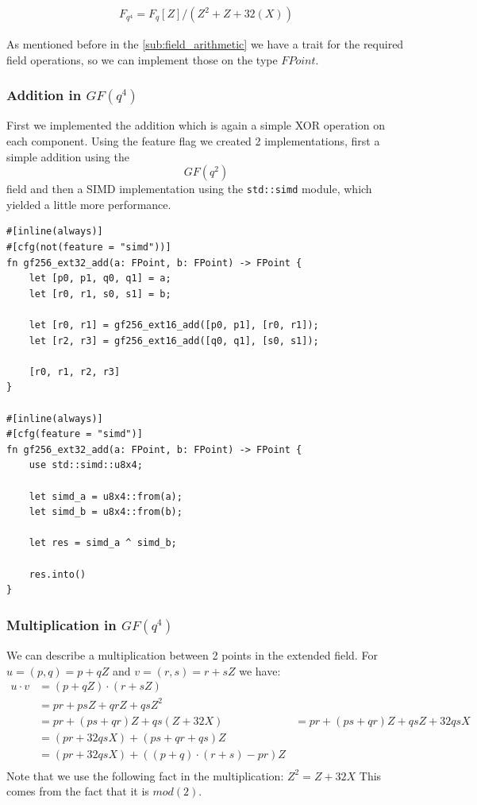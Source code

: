 \documentclass[11pt]{report}
\theoremstyle{definition}
\theoremstyle{plain}
\begin{document}
\begin{align}
  F_{q^4} = F_q[Z] / (Z^2 + Z + 32(X))
\end{align}

As mentioned before in the \autoref{sub:field_arithmetic} we have a trait for the required field operations, so we can implement those on the type $FPoint$.

\subsubsection{Addition in $GF(q^4)$}

First we implemented the addition which is again a simple XOR operation on each component. Using the feature flag we created 2 implementations, first a simple addition using the $$GF(q^2)$$ field and then a SIMD implementation using the \texttt{std::simd} module, which yielded a little more performance.
\begin{verbatim}
#[inline(always)]
#[cfg(not(feature = "simd"))]
fn gf256_ext32_add(a: FPoint, b: FPoint) -> FPoint {
    let [p0, p1, q0, q1] = a;
    let [r0, r1, s0, s1] = b;

    let [r0, r1] = gf256_ext16_add([p0, p1], [r0, r1]);
    let [r2, r3] = gf256_ext16_add([q0, q1], [s0, s1]);

    [r0, r1, r2, r3]
}

#[inline(always)]
#[cfg(feature = "simd")]
fn gf256_ext32_add(a: FPoint, b: FPoint) -> FPoint {
    use std::simd::u8x4;

    let simd_a = u8x4::from(a);
    let simd_b = u8x4::from(b);

    let res = simd_a ^ simd_b;

    res.into()
}
\end{verbatim}

\subsubsection{Multiplication in $GF(q^4)$}
We can describe a multiplication between 2 points in the extended field.
For $u = (p,q) = p + qZ$ and $v = (r,s) = r + sZ$ we have:
\begin{align}
  u \cdot v & = (p + qZ) \cdot (r + sZ)                      \\
            & = pr + psZ + qrZ + qsZ^2                       \\
            & = pr + (ps + qr)Z + qs(Z + 32X)
            & = pr + (ps + qr)Z + qsZ + 32qsX                \\
            & = (pr + 32qsX) + (ps + qr + qs)Z               \\
            & = (pr + 32qsX) + ((p + q) \cdot (r + s) - pr)Z \\
\end{align}
Note that we use the following fact in the multiplication: $Z^2 = Z + 32X$ This comes from the fact that it is $mod(2)$.
\end{document}
